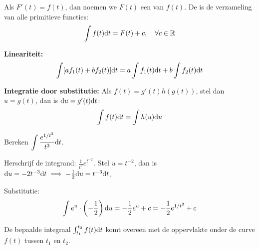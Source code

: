 \begin{conceptbox}
Als $F'(t) = f(t)$, dan noemen we $F(t)$ een  van $f(t)$.
De  is de verzameling van alle primitieve functies:
\[ \int f(t) \mathrm{d} t = F(t) + c, \quad \forall c \in \mathbb{R} \]
\end{conceptbox}

\begin{theorie}
\textbf{Lineariteit:}
\[ \int [a f_1(t) + b f_2(t)] \mathrm{d} t = a \int f_1(t) \mathrm{d} t + b \int f_2(t) \mathrm{d} t \]

\textbf{Integratie door substitutie:}
Als $f(t) = g'(t) h(g(t))$, stel dan $u = g(t)$, dan is $\mathrm{d} u = g'(t) \mathrm{d} t$:
\[ \int f(t) \mathrm{d} t = \int h(u) \mathrm{d} u \]
\end{theorie}

\begin{voorbeeld}
Bereken $\displaystyle \int \frac{e^{1/t^2}}{t^3} \mathrm{d} t$.

Herschrijf de integrand: $\displaystyle \frac{1}{t^3} e^{t^{-2}}$.
Stel $u = t^{-2}$, dan is $\mathrm{d} u = -2t^{-3} \mathrm{d} t \implies -\frac{1}{2} \mathrm{d} u = t^{-3} \mathrm{d} t$.

Substitutie:
\[ \int e^u \cdot \left(-\frac{1}{2}\right) \mathrm{d} u = -\frac{1}{2} e^u + c = -\frac{1}{2} e^{1/t^2} + c \]
\end{voorbeeld}

\begin{conceptbox}
De bepaalde integraal $\int_{t_1}^{t_2} f(t) \mathrm{d} t$ komt overeen met de oppervlakte 
onder de curve $f(t)$ tussen $t_1$ en $t_2$.
\end{conceptbox}

